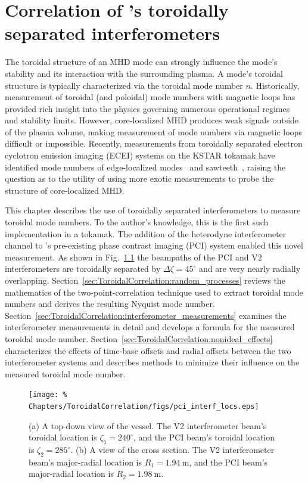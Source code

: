 \chapter{Correlation of \diiid's toroidally separated interferometers}
The toroidal structure of an MHD mode can strongly influence
the mode's stability and its interaction with the surrounding plasma.
A mode's toroidal structure is typically characterized
via the toroidal mode number $n$.
Historically, measurement of toroidal (and poloidal) mode numbers
with magnetic loops has provided rich insight
into the physics governing numerous operational regimes and stability limits.
However, core-localized MHD produces weak signals outside of the plasma volume,
making measurement of mode numbers via magnetic loops difficult or impossible.
Recently, measurements from toroidally separated
electron cyclotron emission imaging (ECEI) systems
on the KSTAR tokamak have identified mode numbers of
edge-localized modes~\cite{lee_rsi_2014} and
sawteeth~\cite{choe_nf_2015},
raising the question as to the utility of using more exotic measurements
to probe the structure of core-localized MHD.

This chapter describes the use of toroidally separated interferometers
to measure toroidal mode numbers.
To the author's knowledge, this is the first such implementation in a tokamak.
The addition of the heterodyne interferometer channel
to \diiid's pre-existing phase contrast imaging (PCI) system
enabled this novel measurement.
As shown in Fig.~\ref{fig:ToroidalCorrelation:pci_interf_locs}
the beampaths of the PCI and V2 interferometers
are toroidally separated by $\Delta \zeta = 45^{\circ}$ and
are very nearly radially overlapping.
Section~\ref{sec:ToroidalCorrelation:random_processes}
reviews the mathematics of the two-point-correlation technique
used to extract toroidal mode numbers and
derives the resulting Nyquist mode number.
Section~\ref{sec:ToroidalCorrelation:interferometer_measurements}
examines the interferometer measurements in detail and
develops a formula for the measured toroidal mode number.
Section~\ref{sec:ToroidalCorrelation:nonideal_effects}
characterizes the effects of time-base offsets and radial offsets
between the two interferometer systems and
describes methods to minimize their influence
on the measured toroidal mode number.

\begin{figure}
  \centering
  \texttt{[image: \%
    Chapters/ToroidalCorrelation/figs/pci\_interf\_locs.eps]}
  \caption[Beam locations of the V2 interferometer and PCI systems on \diiid]{%
    (a) A top-down view of the \diiid\space vessel.
    The V2 interferometer beam's toroidal location is $\zeta_1 = 240^{\circ}$,
    and the PCI beam's toroidal location is $\zeta_2 = 285^{\circ}$.
    (b) A view of the \diiid\space cross section.
    The V2 interferometer beam's
    major-radial location is $R_1 = \SI{1.94}{\meter}$, and
    the PCI beam's major-radial location is $R_2 = \SI{1.98}{\meter}$.}
\label{fig:ToroidalCorrelation:pci_interf_locs}
\end{figure}


